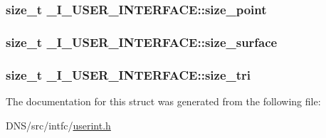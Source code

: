 \subsubsection[{\texorpdfstring{size\+\_\+point}{size_point}}]{\setlength{\rightskip}{0pt plus 5cm}size\+\_\+t \+\_\+\+I\+\_\+\+U\+S\+E\+R\+\_\+\+I\+N\+T\+E\+R\+F\+A\+C\+E\+::size\+\_\+point}\hypertarget{struct___i___u_s_e_r___i_n_t_e_r_f_a_c_e_a0dc89f5b398f0f4809f793b945c847ee}{}\label{struct___i___u_s_e_r___i_n_t_e_r_f_a_c_e_a0dc89f5b398f0f4809f793b945c847ee}
\subsubsection[{\texorpdfstring{size\+\_\+surface}{size_surface}}]{\setlength{\rightskip}{0pt plus 5cm}size\+\_\+t \+\_\+\+I\+\_\+\+U\+S\+E\+R\+\_\+\+I\+N\+T\+E\+R\+F\+A\+C\+E\+::size\+\_\+surface}\hypertarget{struct___i___u_s_e_r___i_n_t_e_r_f_a_c_e_add9a2eb9460df7025ff0c4301a0207a2}{}\label{struct___i___u_s_e_r___i_n_t_e_r_f_a_c_e_add9a2eb9460df7025ff0c4301a0207a2}
\subsubsection[{\texorpdfstring{size\+\_\+tri}{size_tri}}]{\setlength{\rightskip}{0pt plus 5cm}size\+\_\+t \+\_\+\+I\+\_\+\+U\+S\+E\+R\+\_\+\+I\+N\+T\+E\+R\+F\+A\+C\+E\+::size\+\_\+tri}\hypertarget{struct___i___u_s_e_r___i_n_t_e_r_f_a_c_e_acac83f22ebf46e56b3330a30c3189edb}{}\label{struct___i___u_s_e_r___i_n_t_e_r_f_a_c_e_acac83f22ebf46e56b3330a30c3189edb}


The documentation for this struct was generated from the following file\+:\begin{DoxyCompactItemize}
\item 
D\+N\+S/src/intfc/\hyperlink{userint_8h}{userint.\+h}\end{DoxyCompactItemize}
